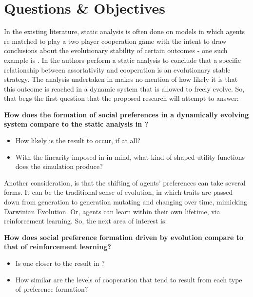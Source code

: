 \documentclass[11pt]{article}
\newcommand*{\np}{\par\noindent\newline}
\begin{document}
\section{Questions \& Objectives}\label{questions}
In the existing literature, static analysis is often done on models in which
agents re matched to play a two player cooperation game with the intent to draw
conclusions about the evolutionary stability of certain outcomes - one such
example is \cite{alger_homo_2013}. In \cite{alger_homo_2013} the authors
perform a static analysis to conclude that a specific relationship between
assortativity and cooperation is an evolutionary stable strategy. The analysis
undertaken in \cite{alger_homo_2013} makes no mention of how likely it is that
this outcome is reached in a dynamic system that is allowed to freely evolve.
So, that begs the first question that the proposed research will attempt to
answer:
\np\textbf{How does the formation of social preferences in a dynamically evolving system compare to the static analysis in \cite{alger_homo_2013}?}
\begin{itemize}
\item How likely is the \cite{alger_homo_2013} result to occur, if at all? 
\item With the linearity imposed in \cite{alger_homo_2013} in mind, what kind
of shaped utility functions does the simulation produce?
\end{itemize}
Another consideration, is that the shifting of agents' preferences can take
several forms. It can be the traditional sense of evolution, in which traits
are passed down from generation to generation mutating and changing over time,
mimicking Darwinian Evolution. Or, agents can learn within their own lifetime,
via reinforcement learning. So, the next area of interest is:
\np\textbf{How does social preference formation driven by evolution compare to that  of reinforcement learning?}
\begin{itemize}
\item Is one closer to the result in \cite{alger_homo_2013}?
\item How similar are the levels of cooperation that tend to result from each
type of preference formation?
\end{itemize}


\end{document}
